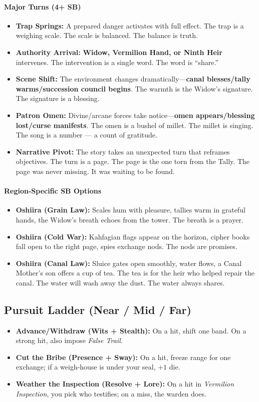 \paragraph{Major Turns (4+ SB)}
\begin{itemize}
\item \textbf{Trap Springs:} A prepared danger activates with full effect. The trap is a weighing scale. The scale is balanced. The balance is truth.
\item \textbf{Authority Arrival:} \textbf{Widow, Vermilion Hand, or Ninth Heir} intervenes. The intervention is a single word. The word is ``share.''
\item \textbf{Scene Shift:} The environment changes dramatically---\textbf{canal blesses/tally warms/succession council begins}. The warmth is the Widow's signature. The signature is a blessing.
\item \textbf{Patron Omen:} Divine/arcane forces take notice---\textbf{omen appears/blessing lost/curse manifests}. The omen is a bushel of millet. The millet is singing. The song is a number --- a count of gratitude.
\item \textbf{Narrative Pivot:} The story takes an unexpected turn that reframes objectives. The turn is a page. The page is the one torn from the Tally. The page was never missing. It was waiting to be found.
\end{itemize}

\paragraph{Region-Specific SB Options}
\begin{itemize}
\item \textbf{Oshiira (Grain Law):} Scales hum with pleasure, tallies warm in grateful hands, the Widow's breath echoes from the tower. The breath is a prayer.
\item \textbf{Oshiira (Cold War):} Kahfagian flags appear on the horizon, cipher books fall open to the right page, spies exchange nods. The nods are promises.
\item \textbf{Oshiira (Canal Law):} Sluice gates open smoothly, water flows, a Canal Mother's son offers a cup of tea. The tea is for the heir who helped repair the canal. The water will wash away the dust. The water always shares.
\end{itemize}

\subsection*{Pursuit Ladder (Near / Mid / Far)}
\begin{itemize}
\item \textbf{Advance/Withdraw (Wits + Stealth):} On a hit, shift one band. On a strong hit, also impose \emph{False Trail}.
\item \textbf{Cut the Bribe (Presence + Sway):} On a hit, freeze range for one exchange; if a weigh-house is under your seal, $+1$ die.
\item \textbf{Weather the Inspection (Resolve + Lore):} On a hit in \emph{Vermilion Inspection}, you pick who testifies; on a miss, the warden does.
\end{itemize}

